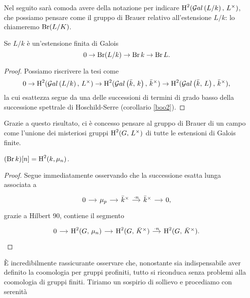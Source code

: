 Nel seguito sarà comoda avere della notazione per indicare $ \operatorname{H}^2(\mathcal{G}al\left( L/k \right), \, L^\times) $, che possiamo pensare come il gruppo di Brauer relativo all'estensione $ L/k $: lo chiameremo $ \operatorname{Br}(L/K) $.

\begin{lemma}\label{stronzetto}
	Se $ L/k $ è un'estensione finita di Galois
	\[ 0 \to \operatorname{Br}(L/k) \to \operatorname{Br} k \to \operatorname{Br} L.  \]
\end{lemma}
\begin{proof}
	Possiamo riscrivere la tesi come
	\[ 0 \to \operatorname{H}^2(\mathcal{G}al\left( L/k \right), \, L^\times) \to \operatorname{H}^2(\mathcal{G}al\left( \bar{k}, \, k \right), \, \bar{k}^\times) \to \operatorname{H}^2(\mathcal{G}al\left( \bar{k}, \, L \right), \, \bar{k}^\times), \]
	la cui esattezza segue da una delle successioni di termini di grado basso della successione spettrale di Hoschild-Serre (corollario \ref{boo2}).
\end{proof}

Grazie a questo risultato, ci è concesso pensare al gruppo di Brauer di un campo come l'unione dei misteriosi gruppi $ \operatorname{H}^2(G, \, L^\times) $ di tutte le estensioni di Galois finite.


\begin{lemma} \label{torsione del brauer}
	$ (\operatorname{Br} k) [n] = \operatorname{H}^2(k, \mu_n) $.
\end{lemma}
\begin{proof}
	Segue immediatamente osservando che la successione esatta lunga associata a 
	\[\begin{tikzcd}[column sep = small]
	0 \rar
	& \mu_p \rar
	& \bar{k}^\times \rar["\cdot n"]
	& \bar{k}^\times \rar
	& 0,
	\end{tikzcd}  \]
	grazie a Hilbert 90, contiene il segmento
	\[\begin{tikzcd}[column sep = small]
	0 \rar
	& \HH^2(G, \, \mu_n) \rar
	& \HH^2(G, \, \bar{\K}^\times) \rar["\cdot n"]
	& \HH^2(G, \, \bar{\K}^\times).
	\end{tikzcd}  \]
\end{proof}

\begin{profinite}
	È incredibilmente rassicurante osservare che, nonostante sia indispensabile aver definito la coomologia per gruppi profiniti, tutto si riconduca senza problemi alla coomologia di gruppi finiti. Tiriamo un sospirio di sollievo e procediamo con serenità
\end{profinite}

